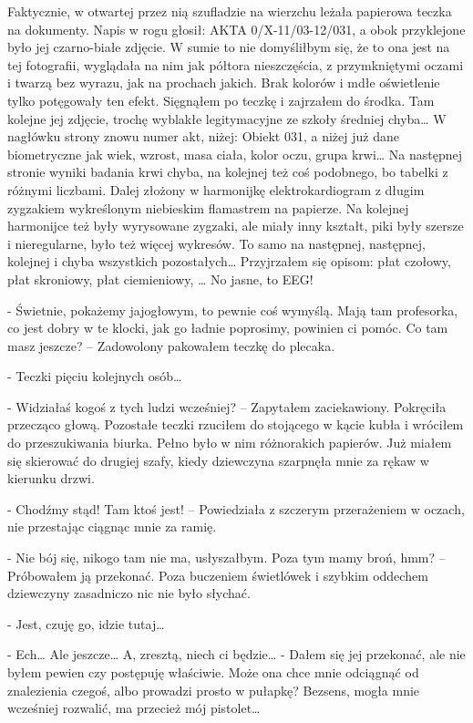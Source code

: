 \documentclass[../MAIN.tex]{subfiles}
\begin{document}
Faktycznie, w otwartej przez nią szufladzie na wierzchu leżała papierowa teczka na dokumenty. Napis w rogu głosił: AKTA 0/X-11/03-12/031, a obok przyklejone było jej czarno-białe zdjęcie. W sumie to nie domyśliłbym się, że to ona jest na tej fotografii, wyglądała na nim jak półtora nieszczęścia, z przymkniętymi oczami i twarzą bez wyrazu, jak na prochach jakich. Brak kolorów i mdłe oświetlenie tylko potęgowały ten efekt. Sięgnąłem po teczkę i zajrzałem do środka. Tam kolejne jej zdjęcie, trochę wyblakłe legitymacyjne ze szkoły średniej chyba… W nagłówku strony znowu numer akt, niżej: Obiekt 031, a niżej już dane biometryczne jak wiek, wzrost, masa ciała, kolor oczu, grupa krwi… Na następnej stronie wyniki badania krwi chyba, na kolejnej też coś podobnego, bo tabelki z różnymi liczbami. Dalej złożony w harmonijkę elektrokardiogram z długim zygzakiem wykreślonym niebieskim flamastrem na papierze. Na kolejnej harmonijce też były wyrysowane zygzaki, ale miały inny kształt, piki były szersze i nieregularne, było też więcej wykresów. To samo na następnej, następnej, kolejnej i chyba wszystkich pozostałych… Przyjrzałem się opisom: płat czołowy, płat skroniowy, płat ciemieniowy, … No jasne, to EEG!

- Świetnie, pokażemy jajogłowym, to pewnie coś wymyślą. Mają tam profesorka, co jest dobry w te klocki, jak go ładnie poprosimy, powinien ci pomóc. Co tam masz jeszcze? – Zadowolony pakowałem teczkę do plecaka.

- Teczki pięciu kolejnych osób…

- Widziałaś kogoś z tych ludzi wcześniej? – Zapytałem zaciekawiony. Pokręciła przecząco głową. Pozostałe teczki rzuciłem do stojącego w kącie kubła i wróciłem do przeszukiwania biurka. Pełno było w nim różnorakich papierów. Już miałem się skierować do drugiej szafy, kiedy dziewczyna szarpnęła mnie za rękaw w kierunku drzwi.

- Chodźmy stąd! Tam ktoś jest! – Powiedziała z szczerym przerażeniem w oczach, nie przestając ciągnąc mnie za ramię.

- Nie bój się, nikogo tam nie ma, usłyszałbym. Poza tym mamy broń, hmm? – Próbowałem ją przekonać. Poza buczeniem świetlówek i szybkim oddechem dziewczyny zasadniczo nic nie było słychać.

- Jest, czuję go, idzie tutaj…

- Ech… Ale jeszcze… A, zresztą, niech ci będzie… - Dałem się jej przekonać, ale nie byłem pewien czy postępuję właściwie. Może ona chce mnie odciągnąć od znalezienia czegoś, albo prowadzi prosto w pułapkę? Bezsens, mogła mnie wcześniej rozwalić, ma przecież mój pistolet…
\end{document}
